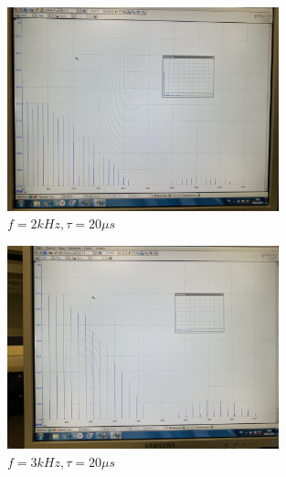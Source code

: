 \documentclass[a4paper, 12pt]{article}
\begin{document}
\begin{figure}[H]
    \centering
    \includegraphics[width=0.7\textwidth]{data/2_20.jpg}
    \caption{$f = 2 kHz, \tau = 20 \mu s$}
    \label{fig:data/2_20.jpg}
\end{figure}
\begin{figure}[H]
    \centering
    \includegraphics[width=0.7\textwidth]{data/3_20.jpg}
    \caption{$f = 3 kHz, \tau = 20 \mu s$}
    \label{fig:data/3_20.jpg}
\end{figure}
\end{document}
